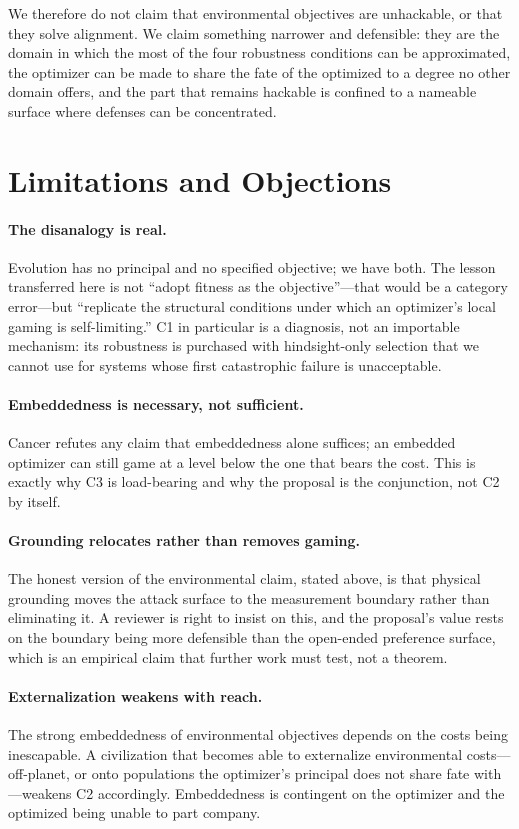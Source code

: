 \documentclass[11pt]{article}
\begin{document}
We therefore do not claim that environmental objectives are unhackable, or that they solve alignment. We claim something narrower and defensible: they are the domain in which the most of the four robustness conditions can be approximated, the optimizer can be made to share the fate of the optimized to a degree no other domain offers, and the part that remains hackable is confined to a nameable surface where defenses can be concentrated.

\section{Limitations and Objections}\label{sec:limits}

\paragraph{The disanalogy is real.} Evolution has no principal and no specified objective; we have both. The lesson transferred here is not ``adopt fitness as the objective''---that would be a category error---but ``replicate the structural conditions under which an optimizer's local gaming is self-limiting.'' C1 in particular is a diagnosis, not an importable mechanism: its robustness is purchased with hindsight-only selection that we cannot use for systems whose first catastrophic failure is unacceptable.

\paragraph{Embeddedness is necessary, not sufficient.} Cancer refutes any claim that embeddedness alone suffices; an embedded optimizer can still game at a level below the one that bears the cost. This is exactly why C3 is load-bearing and why the proposal is the conjunction, not C2 by itself.

\paragraph{Grounding relocates rather than removes gaming.} The honest version of the environmental claim, stated above, is that physical grounding moves the attack surface to the measurement boundary rather than eliminating it. A reviewer is right to insist on this, and the proposal's value rests on the boundary being more defensible than the open-ended preference surface, which is an empirical claim that further work must test, not a theorem.

\paragraph{Externalization weakens with reach.} The strong embeddedness of environmental objectives depends on the costs being inescapable. A civilization that becomes able to externalize environmental costs---off-planet, or onto populations the optimizer's principal does not share fate with---weakens C2 accordingly. Embeddedness is contingent on the optimizer and the optimized being unable to part company.
\end{document}
